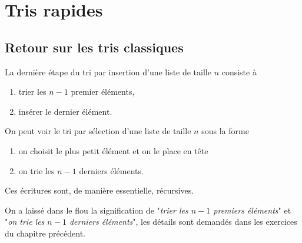 \chapter{Tris rapides}
\section{Retour sur les tris classiques}
La dernière étape du tri par insertion d'une liste de taille $n$ consiste à 
\begin{enumerate}
\item trier les $n-1$ premier éléments,
\item insérer le dernier élément.
\end{enumerate}
On peut voir le tri par sélection d'une liste de taille $n$ sous la forme
\begin{enumerate}
\item on choisit le plus petit élément et on le place en tête
\item on trie les $n-1$ derniers éléments.
\end{enumerate}
Ces écritures sont, de manière essentielle, récursives. 

On a laissé dans le flou la signification de "{\it trier les $n-1$ premiers éléments}" et "{\it on trie les $n-1$ derniers éléments}", les détails sont demandés dans les exercices du chapitre précédent.

